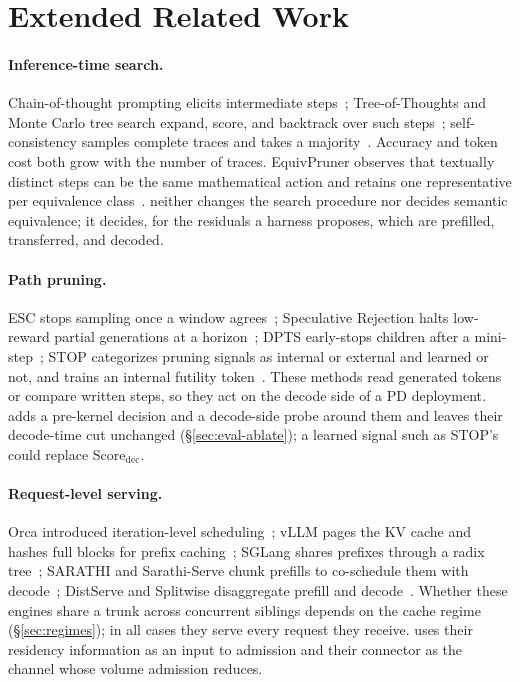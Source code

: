 \section{Extended Related Work}
\label{sec:related-full}

\paragraph{Inference-time search.}
Chain-of-thought prompting elicits intermediate steps~\cite{cot}; Tree-of-Thoughts and Monte Carlo tree search expand, score, and backtrack over such steps~\cite{tot,mctsllm}; self-consistency samples complete traces and takes a majority~\cite{selfconsistency}.
Accuracy and token cost both grow with the number of traces.
EquivPruner observes that textually distinct steps can be the same mathematical action and retains one representative per equivalence class~\cite{equivpruner}.
\sys neither changes the search procedure nor decides semantic equivalence; it decides, for the residuals a harness proposes, which are prefilled, transferred, and decoded.

\paragraph{Path pruning.}
ESC stops sampling once a window agrees~\cite{esc}; Speculative Rejection halts low-reward partial generations at a horizon~\cite{specrej}; DPTS early-stops children after a mini-step~\cite{dpts}; STOP categorizes pruning signals as internal or external and learned or not, and trains an internal futility token~\cite{stoploss}.
These methods read generated tokens or compare written steps, so they act on the decode side of a PD deployment.
\sys adds a pre-kernel decision and a decode-side probe around them and leaves their decode-time cut unchanged (\S\ref{sec:eval-ablate}); a learned signal such as STOP's could replace $\mathrm{Score}_{\mathrm{dec}}$.

\paragraph{Request-level serving.}
Orca introduced iteration-level scheduling~\cite{orca}; vLLM pages the KV cache and hashes full blocks for prefix caching~\cite{vllm}; SGLang shares prefixes through a radix tree~\cite{sglang}; SARATHI and Sarathi-Serve chunk prefills to co-schedule them with decode~\cite{sarathisplit,sarathi}; DistServe and Splitwise disaggregate prefill and decode~\cite{distserve,splitwise}.
Whether these engines share a trunk across concurrent siblings depends on the cache regime (\S\ref{sec:regimes}); in all cases they serve every request they receive.
\sys uses their residency information as an input to admission and their connector as the channel whose volume admission reduces.

